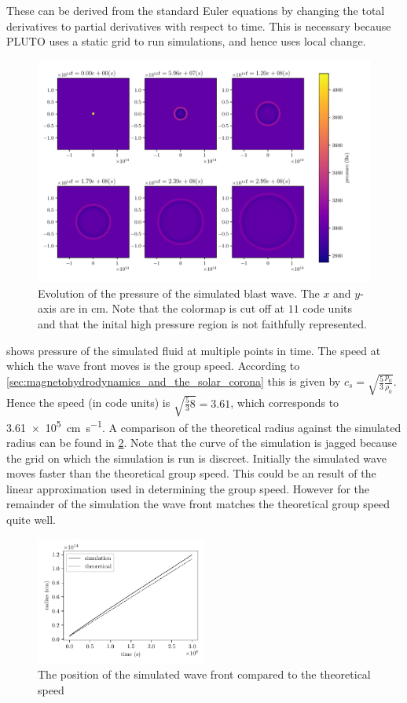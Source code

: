 \documentclass[a4paper]{article}
\begin{document}
These can be derived from the standard Euler equations by changing the total derivatives to partial derivatives with respect to time. This is necessary because PLUTO uses a static grid to run simulations, and hence uses local change. 
\begin{figure}[h]
	\centering
	\includegraphics[width=\textwidth]{figures/blast_wave.pdf}
	\caption{Evolution of the pressure of the simulated blast wave. The $x$ and $y$-axis are in \si{cm}. Note that the colormap is cut off at $11$ code units and that the inital high pressure region is not faithfully represented.}
	\label{fig:blastwave}
\end{figure}

 shows pressure of the simulated fluid at multiple points in time. 
The speed at which the wave front moves is the group speed. 
According to \cref{sec:magnetohydrodynamics_and_the_solar_corona} this is given by $c_s = \sqrt{\frac{5}{3} \frac{p_0}{\rho_0}} $.
Hence the speed (in code units) is $\sqrt{\frac{5}{3}8} = 3.61$, which corresponds to \SI{3.61e5}{\centi\metre\per\second}.
A comparison of the theoretical radius against the simulated radius can be found in \cref{fig:wave_front_speed}. 
Note that the curve of the simulation is jagged because the grid on which the simulation is run is discreet. 
Initially the simulated wave moves faster than the theoretical group speed. 
This could be an result of the linear approximation used in determining the group speed.
However for the remainder of the simulation the wave front matches the theoretical group speed quite well.


\begin{figure}[h]
	\centering
	\includegraphics[width=0.5\textwidth]{figures/wavefront_position.pdf}
	\caption{The position of the simulated wave front compared to the theoretical speed}
	\label{fig:wave_front_speed}
\end{figure}
\end{document}
